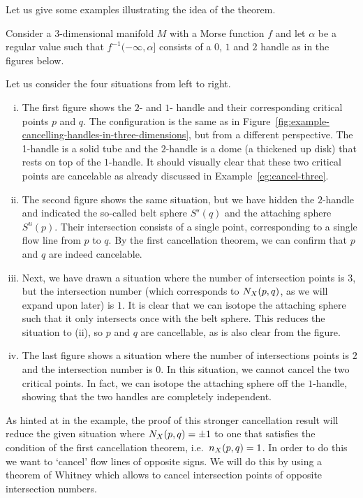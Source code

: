 Let us give some examples illustrating the idea of the theorem.
\begin{eg}
    Consider a $3$-dimensional manifold $M$ with a Morse function $f$ and let $\alpha$ be a regular value such that  $f^{-1}(-\infty, \alpha]$ consists of a $0$, $1$ and  $2$ handle as in the figures below.
    \begin{figure}[H]
    \centering
\end{figure}
    Let us consider the four situations from left to right.
    \begin{enumerate}[(i)]
        \item The first figure shows the $2$- and  $1$- handle and their corresponding critical points $p$ and  $q$.
            The configuration is the same as in Figure~\ref{fig:example-cancelling-handles-in-three-dimensions}, but from a different perspective.
            The 1-handle is a solid tube and the $2$-handle is a dome (a thickened up disk) that rests on top of the $1$-handle.
            It should visually clear that these two critical points are cancelable as already discussed in Example~\ref{eg:cancel-three}.

        \item The second figure shows the same situation, but we have hidden the $2$-handle and indicated the so-called belt sphere $S^{s}(q)$ and the attaching sphere $S^{u}(p)$. Their intersection consists of a single point, corresponding to a single flow line from $p$ to $q$. 
            By the first cancellation theorem, we can confirm that $p$ and  $q$ are indeed cancelable.
        \item Next, we have drawn a situation where the number of intersection points is $3$, but the intersection number (which corresponds to $N_{X}(p, q)$, as we will expand upon later) is $1$. It is clear that we can isotope the attaching sphere such that it only intersects once with the belt sphere.
            This reduces the situation to (ii), so $p$ and  $q$ are cancellable, as is also clear from the figure. 
        \item The last figure shows a situation where the number of intersections points is $2$ and the intersection number is $0$. In this situation, we cannot cancel the two critical points. In fact, we can isotope the attaching sphere off the $1$-handle, showing that the two handles are completely independent.
    \end{enumerate}
\end{eg}
As hinted at in the example, the proof of this stronger cancellation result will reduce the given situation where $N_{X}(p, q) = \pm 1$ to one that satisfies the condition of the first cancellation theorem, i.e.\ $n_{X}(p, q) = 1$.
In order to do this we want to `cancel' flow lines of opposite signs.
We will do this by using a theorem of Whitney which allows to cancel intersection points of opposite intersection numbers.

